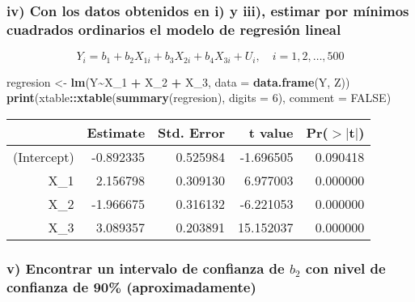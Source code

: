 \documentclass[
]{article}
\newenvironment{Shaded}{\begin{snugshade}}{\end{snugshade}}
\newcommand{\AttributeTok}[1]{\textcolor[rgb]{0.13,0.29,0.53}{#1}}
\newcommand{\ConstantTok}[1]{\textcolor[rgb]{0.56,0.35,0.01}{#1}}
\newcommand{\DecValTok}[1]{\textcolor[rgb]{0.00,0.00,0.81}{#1}}
\newcommand{\FunctionTok}[1]{\textcolor[rgb]{0.13,0.29,0.53}{\textbf{#1}}}
\newcommand{\NormalTok}[1]{#1}
\newcommand{\OtherTok}[1]{\textcolor[rgb]{0.56,0.35,0.01}{#1}}
\newcommand{\SpecialCharTok}[1]{\textcolor[rgb]{0.81,0.36,0.00}{\textbf{#1}}}
\begin{document}
\subsubsection{iv) Con los datos obtenidos en i) y iii), estimar por
mínimos cuadrados ordinarios el modelo de regresión
lineal}\label{iv-con-los-datos-obtenidos-en-i-y-iii-estimar-por-muxednimos-cuadrados-ordinarios-el-modelo-de-regresiuxf3n-lineal}

\[
Y_i = b_1 + b_2X_{1i} + b_3X_{2i} + b_4X_{3i} + U_i, \quad i = 1, 2, \dots, 500
\]

\begin{Shaded}
\begin{Highlighting}[]
\NormalTok{regresion }\OtherTok{\textless{}{-}} \FunctionTok{lm}\NormalTok{(Y}\SpecialCharTok{\textasciitilde{}}\NormalTok{X\_1 }\SpecialCharTok{+}\NormalTok{ X\_2 }\SpecialCharTok{+}\NormalTok{ X\_3, }\AttributeTok{data =} \FunctionTok{data.frame}\NormalTok{(Y, Z))}
\FunctionTok{print}\NormalTok{(xtable}\SpecialCharTok{::}\FunctionTok{xtable}\NormalTok{(}\FunctionTok{summary}\NormalTok{(regresion), }\AttributeTok{digits =} \DecValTok{6}\NormalTok{), }\AttributeTok{comment =} \ConstantTok{FALSE}\NormalTok{)}
\end{Highlighting}
\end{Shaded}

\begin{table}[ht]
\centering
\begin{tabular}{rrrrr}
  \hline
 & Estimate & Std. Error & t value & Pr($>$$|$t$|$) \\ 
  \hline
(Intercept) & -0.892335 & 0.525984 & -1.696505 & 0.090418 \\ 
  X\_1 & 2.156798 & 0.309130 & 6.977003 & 0.000000 \\ 
  X\_2 & -1.966675 & 0.316132 & -6.221053 & 0.000000 \\ 
  X\_3 & 3.089357 & 0.203891 & 15.152037 & 0.000000 \\ 
   \hline
\end{tabular}
\end{table}

\subsubsection{\texorpdfstring{v) Encontrar un intervalo de confianza de
\(b_2\) con nivel de confianza de 90\%
(aproximadamente)}{v) Encontrar un intervalo de confianza de b\_2 con nivel de confianza de 90\% (aproximadamente)}}\label{v-encontrar-un-intervalo-de-confianza-de-b_2-con-nivel-de-confianza-de-90-aproximadamente}
\end{document}
